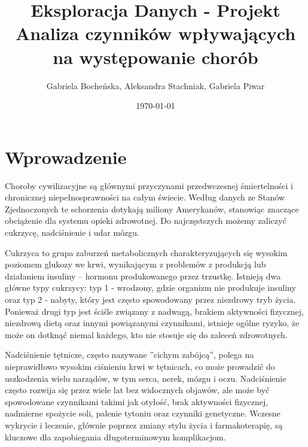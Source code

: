 \documentclass[onecolumn,12pt]{article}
\begin{document}
\title{Eksploracja Danych - Projekt\\
Analiza czynników wpływających na występowanie chorób}
\author{Gabriela Bocheńska, Aleksandra Stachniak, Gabriela Piwar}
\date{\today}
\maketitle
\sloppy

\tableofcontents
\thispagestyle{empty}
\newpage

\section{Wprowadzenie}

\noindent
Choroby cywilizacyjne są głównymi przyczynami przedwczesnej śmiertelności i chronicznej niepełnosprawności na całym świecie. Według danych ze Stanów Zjednoczonych te schorzenia dotykają miliony Amerykanów, stanowiąc znaczące obciążenie dla systemu opieki zdrowotnej. Do najczęstszych możemy zaliczyć cukrzycę, nadciśnienie i udar mózgu.

\vspace{8pt}
\noindent
Cukrzyca to grupa zaburzeń metabolicznych charakteryzujących się wysokim poziomem glukozy we krwi, wynikającym z problemów z produkcją lub działaniem insuliny – hormonu produkowanego przez trzustkę. Istnieją dwa główne typy cukrzycy: typ 1 - wrodzony, gdzie organizm nie produkuje insuliny oraz typ 2 - nabyty, który jest często spowodowany przez niezdrowy tryb życia. Ponieważ
drugi typ jest ściśle związany z nadwagą, brakiem aktywności fizycznej, niezdrową dietą oraz innymi powiązanymi czynnikami, istnieje ogólne ryzyko, że może on dotknąć niemal każdego, kto nie stosuje się do zaleceń zdrowotnych.

\vspace{8pt}
\noindent
Nadciśnienie tętnicze, często nazywane ''cichym zabójcą'', polega na nieprawidłowo wysokim ciśnieniu krwi w tętnicach, co może prowadzić do uszkodzenia wielu narządów, w tym serca, nerek, mózgu i oczu. Nadciśnienie często rozwija się przez wiele lat bez widocznych objawów, ale może być spowodowane czynnikami takimi jak otyłość, brak aktywności fizycznej, nadmierne spożycie soli, palenie tytoniu oraz czynniki genetyczne. Wczesne wykrycie i leczenie, głównie poprzez zmiany stylu życia i farmakoterapię, są kluczowe dla zapobiegania długoterminowym komplikacjom.
\end{document}
